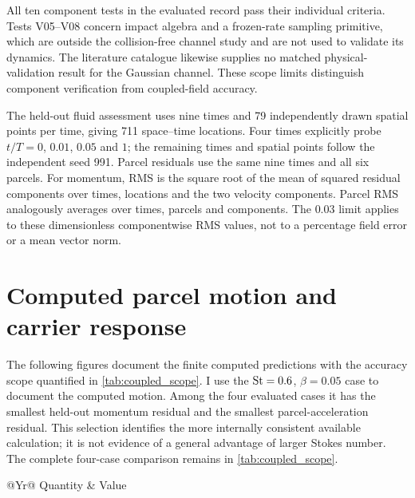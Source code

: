 All ten component tests in the evaluated record pass their individual
criteria. Tests V05--V08 concern impact algebra and a frozen-rate sampling
primitive, which are outside the collision-free channel study and are not
used to validate its dynamics. The literature catalogue likewise supplies
no matched physical-validation result for the Gaussian channel. These
scope limits distinguish component verification from coupled-field accuracy.

The held-out fluid assessment uses nine times and 79 independently drawn
spatial points per time, giving 711 space--time locations. Four times
explicitly probe $t/T=0$, $0.01$, $0.05$ and $1$; the remaining times and
spatial points follow the independent seed 991. Parcel residuals use the
same nine times and all six parcels. For momentum, RMS is the square root
of the mean of squared residual components over times, locations and
the two velocity components. Parcel RMS analogously averages over times,
parcels and components. The $0.03$ limit applies to these dimensionless
componentwise RMS values, not to a percentage field error or a mean vector norm.

\section{Computed parcel motion and carrier response}
The following figures document the finite computed predictions with the
accuracy scope quantified in \cref{tab:coupled_scope}.
I use the $\mathrm{St}=0.6$, $\beta=0.05$ case to document the
computed motion. Among the four evaluated cases it has the smallest
held-out momentum residual and the smallest parcel-acceleration residual.
This selection identifies the more internally consistent available
calculation; it is not evidence of a general advantage of larger Stokes
number. The complete four-case comparison remains in
\cref{tab:coupled_scope}.

\begin{table}[htbp]\centering\small
\caption{Actual settings of the displayed six-parcel computation. Masses
use the planar convention of \cref{eq:parcel_mass}; quantities are
dimensionless unless stated otherwise.}\label{tab:parcel_parameters}
\begin{tabularx}{\textwidth}{@{}Yr@{}}\toprule
Quantity & Value\\\midrule
{}
\bottomrule\end{tabularx}
\end{table}

